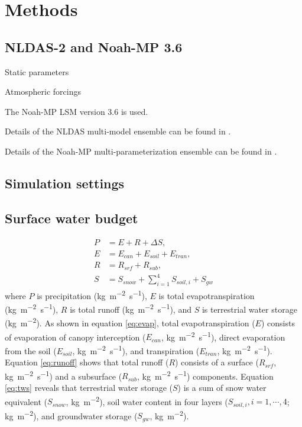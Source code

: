 \documentclass[essd]{copernicus}
\begin{document}
\section{Methods}

\subsection{NLDAS-2 and Noah-MP 3.6}

Static parameters

Atmospheric forcings

The Noah-MP LSM version 3.6 is used.

Details of the NLDAS multi-model ensemble can be found in \citet{xia2012JGRA,xia2012JGRAa,fei2021WRR}.

Details of the Noah-MP multi-parameterization ensemble can be found in \citet{zheng2019WRR,zheng2020JAMES,fei2021WRR}.

\subsection{Simulation settings}

\subsection{Surface water budget}

\begin{align}
    P & = E + R + \Delta S \label{eq:watbal},                          \\
    E & = E_{can} + E_{soil} + E_{tran} \label{eq:evap},               \\
    R & = R_{srf} + R_{sub} \label{eq:runoff},                         \\
    S & = S_{snow} + \sum_{i=1}^{4}S_{soil,i} + S_{gw} \label{eq:tws}
\end{align}
where $P$ is precipitation (\unit{kg~m^{-2}~s^{-1}}), $E$ is total evapotranspiration (\unit{kg~m^{-2}~s^{-1}}), $R$ is total runoff (\unit{kg~m^{-2}~s^{-1}}), and $S$ is terrestrial water storage (\unit{kg~m^{-2}}). As shown in equation \eqref{eq:evap}, total evapotranspiration ($E$) consists of evaporation of canopy interception ($E_{can}$, \unit{kg~m^{-2}~s^{-1}}), direct evaporation from the soil ($E_{soil}$, \unit{kg~m^{-2}~s^{-1}}), and transpiration ($E_{tran}$, \unit{kg~m^{-2}~s^{-1}}). Equation \eqref{eq:runoff} shows that total runoff ($R$) consists of a surface ($R_{srf}$, \unit{kg~m^{-2}~s^{-1}}) and a subsurface ($R_{sub}$, \unit{kg~m^{-2}~s^{-1}}) components. Equation \eqref{eq:tws} reveals that terrestrial water storage ($S$) is a sum of snow water equivalent ($S_{snow}$, \unit{kg~m^{-2}}), soil water content in four layers ($S_{soil,i}, i=1,\cdots,4$; \unit{kg~m^{-2}}), and groundwater storage ($S_{gw}$, \unit{kg~m^{-2}}).
\end{document}
